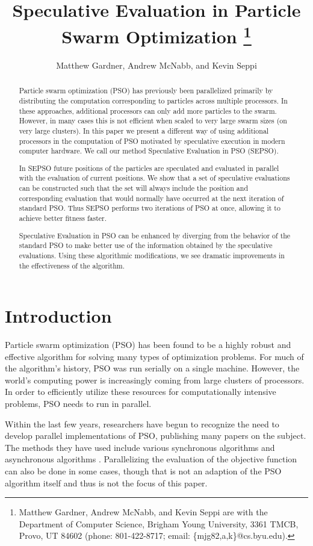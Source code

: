 \documentclass[journal,letterpaper]{IEEEtran}
\title{\ \\ \LARGE\bf Speculative Evaluation in Particle Swarm Optimization%
\thanks{Matthew Gardner, Andrew McNabb, and Kevin Seppi are with the Department
of Computer Science, Brigham Young University, 3361 TMCB, Provo, UT 84602
(phone: 801-422-8717; email: \{mjg82,a,k\}@cs.byu.edu).}%
}
\date{}
\author{Matthew Gardner, Andrew McNabb, and Kevin Seppi}
\begin{document}
\maketitle

\begin{abstract}

Particle swarm optimization (PSO) has previously been parallelized primarily by
distributing the computation corresponding to particles across multiple
processors.  In these approaches, additional processors can only add more
particles to the swarm.  However, in many cases this is not efficient when
scaled to very large swarm sizes (on very large clusters).  In this paper we
present a different way of using additional processors in the computation of
PSO motivated by speculative execution in modern computer hardware.  We call
our method Speculative Evaluation in PSO (SEPSO).

In SEPSO future positions of the particles are speculated and evaluated in
parallel with the evaluation of current positions.  We show that a set of
speculative evaluations can be constructed such that the set will always
include the position and corresponding evaluation that would normally have
occurred at the next iteration of standard PSO.  Thus SEPSO performs two
iterations of PSO at once, allowing it to achieve better fitness faster. 

Speculative Evaluation in PSO can be enhanced by diverging from the behavior of
the standard PSO to make better use of the information obtained by the
speculative evaluations.  Using these algorithmic modifications, we see
dramatic improvements in the effectiveness of the algorithm. 

\end{abstract}

\section{Introduction}
\label{sec:intro}

Particle swarm optimization (PSO) has been found to be a highly robust and
effective algorithm for solving many types of optimization problems.  For much
of the algorithm's history, PSO was run serially on a single machine.  However,
the world's computing power is increasingly coming from large clusters of
processors.  In order to efficiently utilize these resources for
computationally intensive problems, PSO needs to run in parallel.

Within the last few years, researchers have begun to recognize the need to
develop parallel implementations of PSO, publishing many papers on the subject.
The methods they have used include various synchronous algorithms
\cite{chu-2006-intelligent-parallel-pso, jin-2005-pso-antenna-designs,
parsopoulos-2004-parallel-vector-evaluated-pso,
schutte-2004-parallel-global-optimization-with-pso} and asynchronous algorithms
\cite{mostaghim-2006-multi-objective-pso-on-grids,
venter-2005-parallel-pso-asynchronous-evaluations}.  Parallelizing the
evaluation of the objective function can also be done in some cases, though
that is not an adaption of the PSO algorithm itself and thus is not the focus
of this paper.
\end{document}
